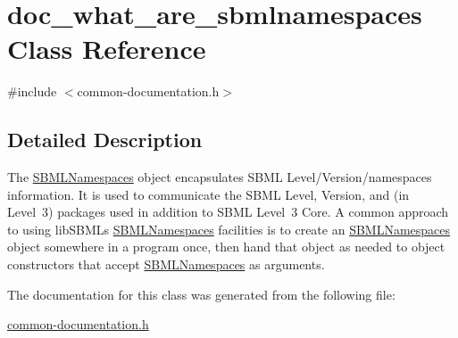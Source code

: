 \hypertarget{classdoc__what__are__sbmlnamespaces}{}\section{doc\+\_\+what\+\_\+are\+\_\+sbmlnamespaces Class Reference}
\label{classdoc__what__are__sbmlnamespaces}


{\ttfamily \#include $<$common-\/documentation.\+h$>$}



\subsection{Detailed Description}
\begin{DoxyParagraph}{}
The \hyperlink{class_s_b_m_l_namespaces}{S\+B\+M\+L\+Namespaces} object encapsulates S\+B\+ML Level/\+Version/namespaces information. It is used to communicate the S\+B\+ML Level, Version, and (in Level~3) packages used in addition to S\+B\+ML Level~3 Core. A common approach to using lib\+S\+B\+ML\textquotesingle{}s \hyperlink{class_s_b_m_l_namespaces}{S\+B\+M\+L\+Namespaces} facilities is to create an \hyperlink{class_s_b_m_l_namespaces}{S\+B\+M\+L\+Namespaces} object somewhere in a program once, then hand that object as needed to object constructors that accept \hyperlink{class_s_b_m_l_namespaces}{S\+B\+M\+L\+Namespaces} as arguments. 
\end{DoxyParagraph}


The documentation for this class was generated from the following file\+:\begin{DoxyCompactItemize}
\item 
\hyperlink{common-documentation_8h}{common-\/documentation.\+h}\end{DoxyCompactItemize}
